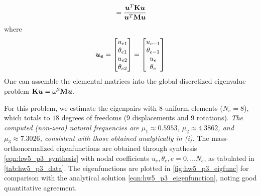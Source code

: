 \begin{enumerate}[(i)]
{\begin{equation}
{        } = \frac{\bm{u}^T \mathbf{K} \bm{u}}{\bm{u}^T \mathbf{M} \bm{u}}
    \end{equation}
    where 
    \begin{equation}
        \bm{u_e} = \begin{bmatrix}
            u_{e1} \\ \theta_{e1} \\ u_{e2} \\ \theta_{e2}
        \end{bmatrix} = \begin{bmatrix}
            u_{e-1} \\ \theta_{e-1} \\ u_{e} \\ \theta_{e}
        \end{bmatrix}
    \end{equation}
    One can assemble the elemental matrices into the global discretized eigenvalue problem $\mathbf{K}\bm{u} = \omega^2 \mathbf{M} \bm{u}$. 

    For this problem, we estimate the eigenpairs with 8 uniform elements ($N_e = 8$), which totals to $18$ degrees of freedoms (9 displacements and 9 rotations).
    \emph{The computed (non-zero) natural frequencies are $\mu_1 \approx 0.5953$, $\mu_2 \approx 4.3862$, and $\mu_3 \approx 7.3026$, consistent with those obtained analytically in (i).}
    The mass-orthonormalized eigenfunctions are obtained through synthesis \cref{eqn:hw5_p3_synthesis} with nodal coefficients $u_e, \theta_e, e = 0, \ldots N_e$, as tabulated in \cref{tab:hw5_p3_data}.
    The eigenfunctions are plotted in \cref{fig:hw5_p3_eigfunc} for comparison with the analytical solution \cref{eqn:hw5_p3_eigenfunction}, noting good quantitative agreement. 

}
\end{enumerate}
